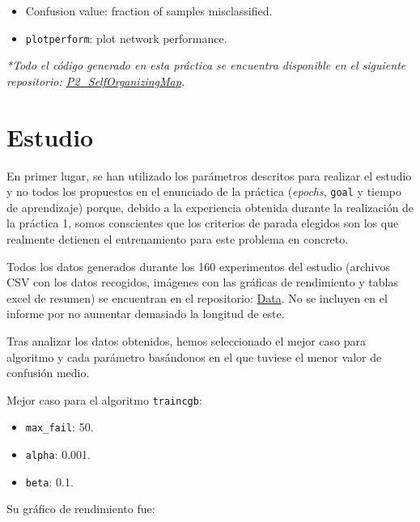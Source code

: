 \documentclass[a4paper,12pt,titlepage]{article}
\begin{document}
\begin{itemize}[noitemsep]
	\item Confusion value: fraction of samples misclassified.
	\item \lstinline|plotperform|: plot network performance. \citep{matlab:plotperform}
\end{itemize}

\emph{*Todo el código generado en esta práctica se encuentra disponible en el siguiente repositorio: 
\href{https://github.com/davidmigloz/neuronal-networks/tree/master/P2\_SelfOrganizingMap}{P2\_SelfOrganizingMap}.}

\section{Estudio}

En primer lugar, se han utilizado los parámetros descritos para realizar el estudio y no todos los propuestos en el enunciado de la práctica (\textit{epochs}, \lstinline|goal| y tiempo de aprendizaje) porque, debido a la experiencia obtenida durante la realización de la práctica 1, somos conscientes que los criterios de parada elegidos son los que realmente detienen el entrenamiento para este problema en concreto.

Todos los datos generados durante los 160 experimentos del estudio (archivos CSV con los datos recogidos, imágenes con las gráficas de rendimiento y tablas excel de resumen) se encuentran en el repositorio: \href{https://github.com/davidmigloz/neuronal-networks/tree/master/P3b\_MLP/data}{Data}. No se incluyen en el informe por no aumentar demasiado la longitud de este.

Tras analizar los datos obtenidos, hemos seleccionado el mejor caso para algoritmo y cada parámetro basándonos en el que tuviese el menor valor de confusión medio.

Mejor caso para el algoritmo \lstinline|traincgb|:

\begin{itemize}[noitemsep]
	\item \lstinline|max_fail|: 50.
	\item \lstinline|alpha|: 0.001.
	\item \lstinline|beta|: 0.1.
\end{itemize}

Su gráfico de rendimiento fue:
\end{document}
